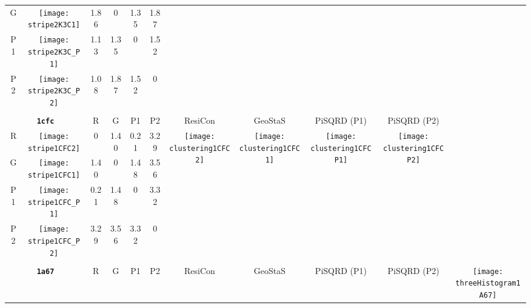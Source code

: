\documentclass[a4paper,11pt,twoside]{book}%
\begin{document}
\begin{appendices}
\begin{sidewaystable}[h!]
\begin{tabular*}{4cm}{cc|c|c|c|c|c|c|c|c|c|}
\cline{1-6}
\multicolumn{1}{|c|}{G} & \texttt{[image: stripe2K3C1]} & 1.86 & 0 & 1.35 & 1.87 & \multirow{4}{*}{} & \multirow{4}{*}{} & \multirow{4}{*}{} & \multirow{4}{*}{} & \multirow{5}{*}{} \\
\cline{1-6}
\multicolumn{1}{|c|}{P1} & \texttt{[image: stripe2K3C\_P1]} & 1.13 & 1.35 & 0 & 1.52 & \multirow{4}{*}{} & \multirow{4}{*}{} & \multirow{4}{*}{} & \multirow{4}{*}{} & \multirow{5}{*}{}  \\
\cline{1-6}
\multicolumn{1}{|c|}{P2} & \texttt{[image: stripe2K3C\_P2]} & 1.08 & 1.87 & 1.52 & 0 & \multirow{4}{*}{} & \multirow{4}{*}{} & \multirow{4}{*}{} & \multirow{4}{*}{} & \multirow{5}{*}{}  \\
\cline{1-11}
\\
\cline{1-11}
\multicolumn{2}{|c|}{{\bf \texttt{1cfc}}} & R & G & P1 & P2 & ResiCon & GeoStaS & PiSQRD (P1) & PiSQRD (P2) & \multirow{5}{*}{\vspace{-0.15cm}\texttt{[image: threeHistogram1CFC]}}  \\
\cline{1-10}
\multicolumn{1}{|c|}{R} & \texttt{[image: stripe1CFC2]} & 0 & 1.40 & 0.21 & 3.29 & \multirow{4}{*}{\vspace{-0.3cm}\texttt{[image: clustering1CFC2]}} & \multirow{4}{*}{\vspace{-0.3cm}\texttt{[image: clustering1CFC1]}} & \multirow{4}{*}{\vspace{-0.3cm}\texttt{[image: clustering1CFCP1]}} & \multirow{4}{*}{\vspace{-0.3cm}\texttt{[image: clustering1CFCP2]}} &  \multirow{5}{*}{} \\
\cline{1-6}
\multicolumn{1}{|c|}{G} & \texttt{[image: stripe1CFC1]} & 1.40 & 0 & 1.48 & 3.56 & \multirow{4}{*}{} & \multirow{4}{*}{} & \multirow{4}{*}{} & \multirow{4}{*}{} & \multirow{5}{*}{} \\
\cline{1-6}
\multicolumn{1}{|c|}{P1} & \texttt{[image: stripe1CFC\_P1]} & 0.21 & 1.48 & 0 & 3.32 & \multirow{4}{*}{} & \multirow{4}{*}{} & \multirow{4}{*}{} & \multirow{4}{*}{} & \multirow{5}{*}{}  \\
\cline{1-6}
\multicolumn{1}{|c|}{P2} & \texttt{[image: stripe1CFC\_P2]} & 3.29 & 3.56 & 3.32 & 0 & \multirow{4}{*}{} & \multirow{4}{*}{} & \multirow{4}{*}{} & \multirow{4}{*}{} & \multirow{5}{*}{}  \\
\cline{1-11}
\\
\cline{1-11}
\multicolumn{2}{|c|}{{\bf \texttt{1a67}}} & R & G & P1 & P2 & ResiCon & GeoStaS & PiSQRD (P1) & PiSQRD (P2) & \multirow{5}{*}{\vspace{-0.15cm}\texttt{[image: threeHistogram1A67]}}  \\

\end{tabular*}
\end{sidewaystable}
\end{appendices}
\end{document}
